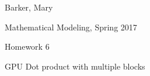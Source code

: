 \documentclass{article}
\def \hwnum{6}
\def \hwdescription{GPU Dot product with multiple blocks}
\def \hwscript{hw06.cu}
\begin{document}
{\color{white}{thing}}
\begin{center}
{
	\fontsize{20pt}{20pt}\selectfont
	Barker, Mary
}

\vspace{1cm}

{
	\fontsize{20pt}{20pt}\selectfont
	Mathematical Modeling, Spring 2017
}

\vspace{1cm}

{
	\fontsize{20pt}{20pt}\selectfont
	Homework \hwnum
}

\vspace{1cm}

{
	\fontsize{20pt}{20pt}\selectfont
	\hwdescription
}

\end{center}
\pagebreak

\end{document}
